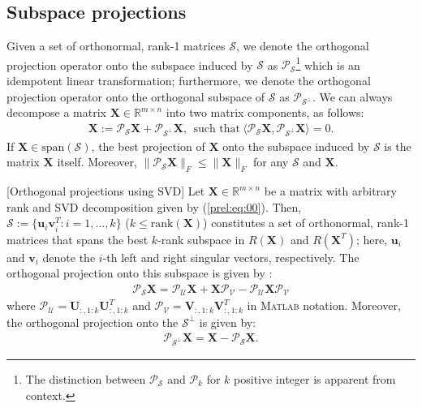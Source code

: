 \documentclass[twocolumn]{svjour3}
\newcommand{\vectornormbig}[1]{\big\|#1\big\|}
\newcommand{\signal}{\boldsymbol{X}}
\newcommand{\dimension}{m \times n}
\newcommand{\rank}{k}
\begin{document}
\subsection{Subspace projections}
Given a set of orthonormal, rank-1 matrices $ \mathcal{S} $, we denote the orthogonal projection operator onto the subspace induced by $ \mathcal{S} $ as $ \mathcal{P}_{\mathcal{S}} $\footnote{The distinction between $ \mathcal{P}_{\mathcal{S}} $ and $ \mathcal{P}_{\rank} $ for $ \rank $ positive integer is apparent from context.} which is an idempotent linear transformation; furthermore, we denote the orthogonal projection operator onto the orthogonal subspace of $ \mathcal{S} $ as $ \mathcal{P}_{\mathcal{S}^{\bot}} $. 
We can always decompose a matrix $ \signal \in \mathbb{R}^{\dimension} $ into two matrix components, as follows:
\begin{align}
\boldsymbol{X} := \mathcal{P}_{\mathcal{S}} \boldsymbol{X} + \mathcal{P}_{\mathcal{S}^{\bot}} \boldsymbol{X}, ~~\text{such that}~ \langle \mathcal{P}_{\mathcal{S}} \boldsymbol{X}, \mathcal{P}_{\mathcal{S}^{\bot}}\boldsymbol{X} \rangle = 0. \nonumber
\end{align} If $ \signal \in \text{span}(\mathcal{S}) $, the best projection of $ \signal $ onto the subspace induced by $ \mathcal{S} $ is the matrix $ \signal $ itself. Moreover, $ \vectornormbig{\mathcal{P}_{\mathcal{S}}\signal}_F \leq \vectornormbig{\signal}_F $ for any $\mathcal{S}$ and $\signal$.
\begin{definition}{\label{def:svd_proj}}[Orthogonal projections using SVD]
Let $ \signal \in \mathbb{R}^{\dimension} $ be a matrix with arbitrary $ \text{rank} $ and SVD decomposition given by (\ref{prel:eq:00}). Then, $ \mathcal{S}:= \lbrace \boldsymbol{u}_i \boldsymbol{v}_i^T: i = 1,\dots, \rank \rbrace $ ($\rank \leq \text{rank}(\signal)$) constitutes a set of orthonormal, rank-1 matrices that spans the best $k$-rank subspace in $R(\signal)$ and $R(\signal^T)$; here, $ \boldsymbol{u}_i $ and $\boldsymbol{v}_i$ denote the $ i $-th left and right singular vectors, respectively. The orthogonal projection onto this subspace is given by \cite{candès2009exact}:
\begin{align}
\mathcal{P}_{\mathcal{S}} \signal = \mathcal{P}_{\mathcal{U}} \signal + \signal \mathcal{P}_{\mathcal{V}} - \mathcal{P}_{\mathcal{U}} \signal \mathcal{P}_{\mathcal{V}} \label{eq:newproj}
\end{align} where $\mathcal{P}_{\mathcal{U}} = \boldsymbol{U}_{:, 1:\rank} \boldsymbol{U}_{:, 1:\rank}^T$ and $\mathcal{P}_{\mathcal{V}} = \boldsymbol{V}_{:, 1:\rank} \boldsymbol{V}_{:, 1:\rank}^T$ in \textsc{Matlab} notation. Moreover, the orthogonal projection onto the $\mathcal{S}^{\bot}$ is given by:
\begin{align}
\mathcal{P}_{\mathcal{S}^{\bot}} \signal = \signal - \mathcal{P}_{\mathcal{S}} \signal. \label{eq:neworthoproj}
\end{align}
\end{definition}
\end{document}
